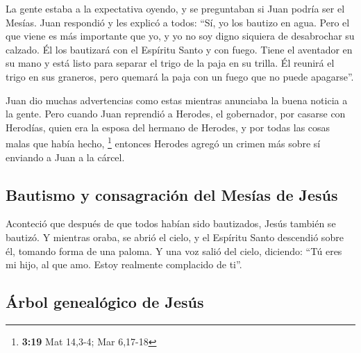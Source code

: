  La gente estaba a la expectativa oyendo, y se
preguntaban si Juan podría ser el Mesías.  Juan respondió
y les explicó a todos: ``Sí, yo los bautizo en agua. Pero el que viene
es más importante que yo, y yo no soy digno siquiera de desabrochar su
calzado. Él los bautizará con el Espíritu Santo y con fuego.
 Tiene el aventador en su mano y está listo para separar
el trigo de la paja en su trilla. Él reunirá el trigo en sus graneros,
pero quemará la paja con un fuego que no puede apagarse''.

 Juan dio muchas advertencias como estas mientras
anunciaba la buena noticia a la gente.  Pero cuando Juan
reprendió a Herodes, el gobernador, por casarse con Herodías, quien era
la esposa del hermano de Herodes, y por todas las cosas malas que había
hecho, \footnote{\textbf{3:19} Mat 14,3-4; Mar 6,17-18} 
entonces Herodes agregó un crimen más sobre sí enviando a Juan a la
cárcel.

\hypertarget{bautismo-y-consagraciuxf3n-del-mesuxedas-de-jesuxfas}{%
\subsection{Bautismo y consagración del Mesías de
Jesús}\label{bautismo-y-consagraciuxf3n-del-mesuxedas-de-jesuxfas}}

 Aconteció que después de que todos habían sido
bautizados, Jesús también se bautizó. Y mientras oraba, se abrió el
cielo,  y el Espíritu Santo descendió sobre él, tomando
forma de una paloma. Y una voz salió del cielo, diciendo: ``Tú eres mi
hijo, al que amo. Estoy realmente complacido de ti''.

\hypertarget{uxe1rbol-genealuxf3gico-de-jesuxfas}{%
\subsection{Árbol genealógico de
Jesús}\label{uxe1rbol-genealuxf3gico-de-jesuxfas}}

